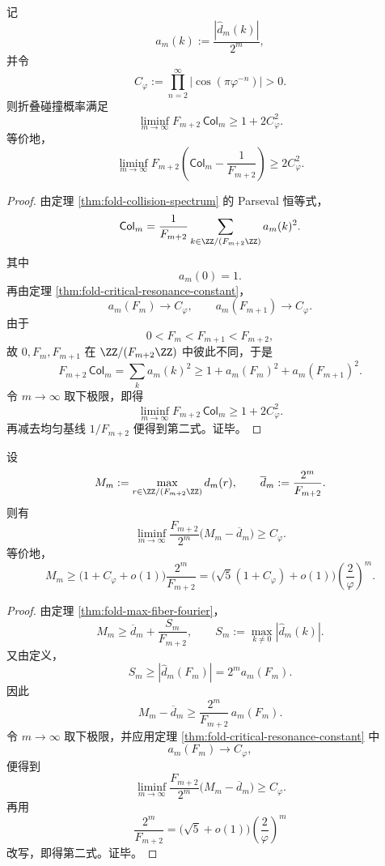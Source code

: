 \begin{theorem}[黄金共振导致的碰撞缺口硬下界]\label{thm:conclusion-fold-golden-resonance-collision-gap-hard-floor}
记
\[
a_m(k):=\frac{|\widehat d_m(k)|}{2^m},
\]
并令
\[
C_\varphi:=\prod_{n=2}^{\infty}\bigl|\cos(\pi\varphi^{-n})\bigr|>0.
\]
则折叠碰撞概率满足
\[
\liminf_{m\to\infty}F_{m+2}\,\mathsf{Col}_m
\ge
1+2C_\varphi^2.
\]
等价地，
\[
\liminf_{m\to\infty}
F_{m+2}\left(\mathsf{Col}_m-\frac{1}{F_{m+2}}\right)
\ge
2C_\varphi^2.
\]
\end{theorem}
\begin{proof}
由定理 \ref{thm:fold-collision-spectrum} 的 Parseval 恒等式，
\[
\mathsf{Col}_m=\frac{1}{F_{m+2}}\sum_{k\in \ZZ/(F_{m+2}\ZZ)}a_m(k)^2.
\]
其中
\[
a_m(0)=1.
\]
再由定理 \ref{thm:fold-critical-resonance-constant}，
\[
a_m(F_m)\longrightarrow C_\varphi,
\qquad
a_m(F_{m+1})\longrightarrow C_\varphi.
\]
由于
\[
0<F_m<F_{m+1}<F_{m+2},
\]
故 \(0,F_m,F_{m+1}\) 在 \(\ZZ/(F_{m+2}\ZZ)\) 中彼此不同，于是
\[
F_{m+2}\,\mathsf{Col}_m
=
\sum_k a_m(k)^2
\ge
1+a_m(F_m)^2+a_m(F_{m+1})^2.
\]
令 \(m\to\infty\) 取下极限，即得
\[
\liminf_{m\to\infty}F_{m+2}\,\mathsf{Col}_m
\ge
1+2C_\varphi^2.
\]
再减去均匀基线 \(1/F_{m+2}\) 便得到第二式。证毕。
\end{proof}

\begin{theorem}[极大纤维的黄金共振抬升]\label{thm:conclusion-fold-golden-resonance-maxfiber-lift}
设
\[
M_m:=\max_{r\in \ZZ/(F_{m+2}\ZZ)} d_m(r),
\qquad
\overline d_m:=\frac{2^m}{F_{m+2}}.
\]
则有
\[
\liminf_{m\to\infty}\frac{F_{m+2}}{2^m}\bigl(M_m-\overline d_m\bigr)\ge C_\varphi.
\]
等价地，
\[
M_m
\ge
\bigl(1+C_\varphi+o(1)\bigr)\frac{2^m}{F_{m+2}}
=
\bigl(\sqrt5(1+C_\varphi)+o(1)\bigr)\left(\frac{2}{\varphi}\right)^m.
\]
\end{theorem}
\begin{proof}
由定理 \ref{thm:fold-max-fiber-fourier}，
\[
M_m\ge \overline d_m+\frac{S_m}{F_{m+2}},
\qquad
S_m:=\max_{k\ne 0}|\widehat d_m(k)|.
\]
又由定义，
\[
S_m\ge |\widehat d_m(F_m)|=2^m a_m(F_m).
\]
因此
\[
M_m-\overline d_m
\ge
\frac{2^m}{F_{m+2}}\,a_m(F_m).
\]
令 \(m\to\infty\) 取下极限，并应用定理 \ref{thm:fold-critical-resonance-constant} 中
\[
a_m(F_m)\to C_\varphi,
\]
便得到
\[
\liminf_{m\to\infty}\frac{F_{m+2}}{2^m}\bigl(M_m-\overline d_m\bigr)\ge C_\varphi.
\]
再用
\[
\frac{2^m}{F_{m+2}}=\bigl(\sqrt5+o(1)\bigr)\left(\frac{2}{\varphi}\right)^m
\]
改写，即得第二式。证毕。
\end{proof}

